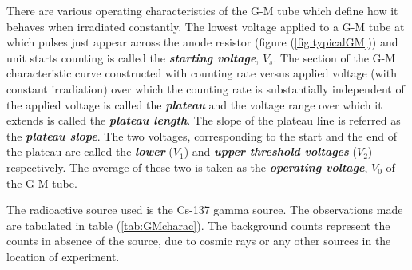 \documentclass[%
 reprint,
nofootinbib,
 amsmath,amssymb,
 aps,
floatfix,
]{revtex4-2}
\begin{document}
        \par
        There are various operating characteristics of the G-M tube which define how it behaves when irradiated constantly. The lowest voltage applied to a G-M tube at which pulses just appear across the anode resistor (figure (\ref{fig:typicalGM})) and unit starts counting is called the \textbf{\textit{starting voltage}}, $V_s$. The section of the G-M characteristic curve constructed with counting rate versus applied voltage (with constant irradiation) over which the counting rate is substantially independent of the applied voltage is called the \textbf{\textit{plateau}} and the voltage range over which it extends is called the \textbf{\textit{plateau length}}. The slope of the plateau line is referred as the \textbf{\textit{plateau slope}}. The two voltages, corresponding to the start and the end of the plateau are called the \textbf{\textit{lower}} ($V_1$) and \textbf{\textit{upper threshold voltages}} ($V_2$) respectively. The average of these two is taken as the \textbf{\textit{operating voltage}}, $V_0$ of the G-M tube.
        
        The radioactive source used is the Cs-137 gamma source. The observations made are tabulated in table (\ref{tab:GMcharac}). The background counts represent the counts in absence of the source, due to cosmic rays or any other sources in the location of experiment.
            
\end{document}
